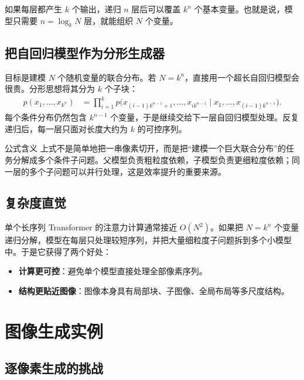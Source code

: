 \documentclass[UTF8,11pt,a4paper]{ctexart}
\newcommand{\term}[1]{\textbf{\textcolor{mainblue}{#1}}}
\begin{document}
如果每层都产生 $k$ 个输出，递归 $n$ 层后可以覆盖 $k^n$ 个基本变量。也就是说，模型只需要 $n=\log_k N$ 层，就能组织 $N$ 个变量。

\subsection{把自回归模型作为分形生成器}

目标是建模 $N$ 个随机变量的联合分布。若 $N=k^n$，直接用一个超长自回归模型会很贵。分形思想将其分为 $k$ 个子块：
\begin{equation}
\begin{aligned}
 p(x_1,\ldots,x_{k^n})
 &=\prod_{i=1}^{k}p\Big(
 x_{(i-1)k^{n-1}+1},\ldots,x_{ik^{n-1}}
 \mid x_1,\ldots,x_{(i-1)k^{n-1}}
 \Big).
\end{aligned}
\end{equation}
每个条件分布仍然包含 $k^{n-1}$ 个变量，于是继续交给下一层自回归模型处理。反复递归后，每一层只面对长度大约为 $k$ 的可控序列。

\begin{infobox}{公式含义}
上式不是简单地把一串像素切开，而是把“建模一个巨大联合分布”的任务分解成多个条件子问题。父模型负责粗粒度依赖，子模型负责更细粒度依赖；同一层的多个子问题可以并行处理，这是效率提升的重要来源。
\end{infobox}

\subsection{复杂度直觉}

单个长序列 Transformer 的注意力计算通常接近 $O(N^2)$。如果把 $N=k^n$ 个变量递归分解，模型在每层只处理较短序列，并把大量细粒度子问题拆到多个小模型中。于是它获得了两个好处：
\begin{itemize}
    \item \term{计算更可控}：避免单个模型直接处理全部像素序列。
    \item \term{结构更贴近图像}：图像本身具有局部块、子图像、全局布局等多尺度结构。
\end{itemize}

\section{图像生成实例}

\subsection{逐像素生成的挑战}
\end{document}
